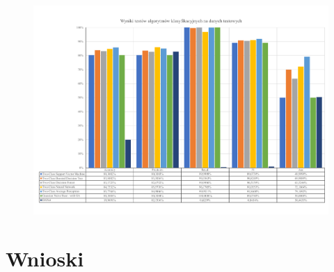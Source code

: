 \begin{landscape}
    \vspace*{\fill}
    \begin{figure}[H]
        \centering
        \includegraphics[height=0.8\textwidth]{images/predict_result}
        \label{fig:predict-result}
    \end{figure}
    \vfill
\end{landscape}


\section{Wnioski}

